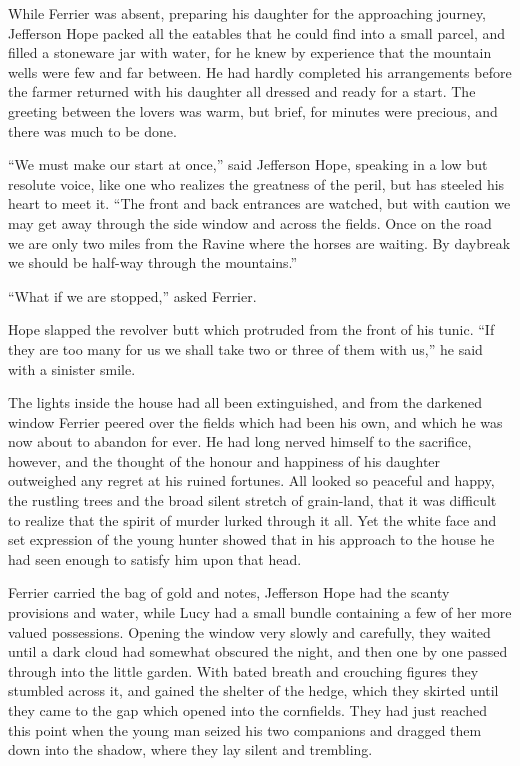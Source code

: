 \documentclass[12pt,english]{book}
\begin{document}
While Ferrier was absent, preparing his daughter for the approaching
journey, Jefferson Hope packed all the eatables that he could find
into a small parcel, and filled a stoneware jar with water, for he
knew by experience that the mountain wells were few and far between.
He had hardly completed his arrangements before the farmer returned
with his daughter all dressed and ready for a start. The greeting
between the lovers was warm, but brief, for minutes were precious,
and there was much to be done.

{}``We must make our start at once,'' said Jefferson Hope, speaking
in a low but resolute voice, like one who realizes the greatness of
the peril, but has steeled his heart to meet it. {}``The front and
back entrances are watched, but with caution we may get away through
the side window and across the fields. Once on the road we are only
two miles from the Ravine where the horses are waiting. By daybreak
we should be half-way through the mountains.''

{}``What if we are stopped,'' asked Ferrier.

Hope slapped the revolver butt which protruded from the front of his
tunic. {}``If they are too many for us we shall take two or three
of them with us,'' he said with a sinister smile.

The lights inside the house had all been extinguished, and from the
darkened window Ferrier peered over the fields which had been his
own, and which he was now about to abandon for ever. He had long nerved
himself to the sacrifice, however, and the thought of the honour and
happiness of his daughter outweighed any regret at his ruined fortunes.
All looked so peaceful and happy, the rustling trees and the broad
silent stretch of grain-land, that it was difficult to realize that
the spirit of murder lurked through it all. Yet the white face and
set expression of the young hunter showed that in his approach to
the house he had seen enough to satisfy him upon that head.

Ferrier carried the bag of gold and notes, Jefferson Hope had the
scanty provisions and water, while Lucy had a small bundle containing
a few of her more valued possessions. Opening the window very slowly
and carefully, they waited until a dark cloud had somewhat obscured
the night, and then one by one passed through into the little garden.
With bated breath and crouching figures they stumbled across it, and
gained the shelter of the hedge, which they skirted until they came
to the gap which opened into the cornfields. They had just reached
this point when the young man seized his two companions and dragged
them down into the shadow, where they lay silent and trembling.
\end{document}
